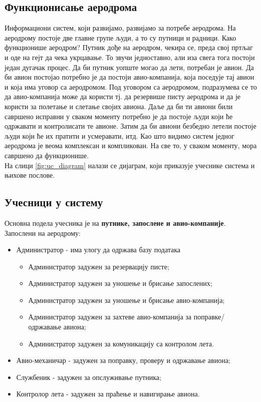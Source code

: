 \documentclass{article}
\begin{document}
\subsection{Функционисање аеродрома}
Информациони систем, који развијамо, развијамо за потребе аеродрома. На аеродрому постоје две главне групе људи, а то су путници и радници. Како функционише аеродром? Путник дође на аеродром, чекира се, преда свој пртљаг и оде на гејт да чека укрцавање. То звучи једноставно, али иза свега тога постоји један дугачак процес. Да би путник уопште могао да лети, потребан је авион. Да би авион постојао потребно је да постоји авио-компанија, која поседује тај авион и која има уговор са аеродромом. Под уговором са аеродромом, подразумева се то да авио-компанија може да користи тј. да резервише писту аеродрома и да је користи за полетање и слетање својих авиона. Даље да би ти авиони били савршено исправни у сваком моменту потребно је да постоје људи који ће одржавати и контролисати те авионе. Затим да би авиони безбедно летели постоје људи који ће их пратити и усмеравати, итд. Као што видимо систем једног аеродрома је веома комплексан и компликован. На све то, у сваком моменту, мора савршено да функционише. \\
    На слици \ref{fig:uc_diagram} налази се дијаграм, који приказује учеснике система и њихове послове.

\subsection{Учесници у систему}
Основна подела учесника је на \textbf{путнике, запослене и авио-компаније}.\\
Запослени на аеродрому:
\begin{itemize}
    \item Администратор - има улогу да одржава базу података
        \begin{itemize}
            \item Администратор задужен за резервацију писте;
            \item Администратор задужен за уношење и брисање запослених;
            \item Администратор задужен за уношење и брисање авио-компанија;
            \item Администратор задужен за захтеве авио-компанија за поправке/одржавање авиона;
            \item Администратор задужен за комуникацију са контролом лета.
        \end{itemize}
    \item Авио-механичар - задужен за поправку, проверу и одржавање авиона;
    \item Службеник - задужен за опслуживање путника;
    \item Контролор лета - задужен за праћење и навигирање авиона.
\end{itemize}
\end{document}
